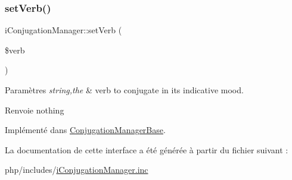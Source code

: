 \hypertarget{interfacei_conjugation_manager_a1b56822fc7f5f7b7b9c0b0c406993b3c}{}\label{interfacei_conjugation_manager_a1b56822fc7f5f7b7b9c0b0c406993b3c} 
\subsubsection{\texorpdfstring{set\+Verb()}{setVerb()}}
{\footnotesize\ttfamily i\+Conjugation\+Manager\+::set\+Verb (\begin{DoxyParamCaption}\item[{}]{\$verb }\end{DoxyParamCaption})}


\begin{DoxyParams}{Paramètres}
{\em string,the} & verb to conjugate in its indicative mood. \\
\hline
\end{DoxyParams}
\begin{DoxyReturn}{Renvoie}
nothing 
\end{DoxyReturn}


Implémenté dans \hyperlink{class_conjugation_manager_base_a36a53a9f0bc2114a5429bcf9e3cd351e}{Conjugation\+Manager\+Base}.



La documentation de cette interface a été générée à partir du fichier suivant \+:\begin{DoxyCompactItemize}
\item 
php/includes/\hyperlink{i_conjugation_manager_8inc}{i\+Conjugation\+Manager.\+inc}\end{DoxyCompactItemize}
